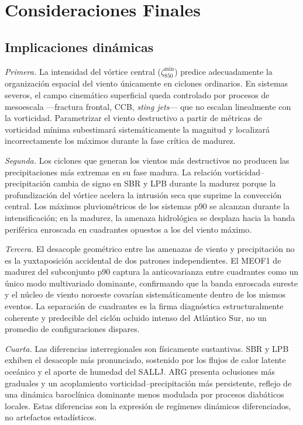 \chapter{Consideraciones Finales}\label{cap:Considerações}


\section{Implicaciones dinámicas}

\textit{Primera.} La intensidad del vórtice central ($\zeta_{850}^{\min}$) predice adecuadamente la organización espacial del viento únicamente en ciclones ordinarios. En sistemas severos, el campo cinemático superficial queda controlado por procesos de mesoescala ---fractura frontal, CCB, \textit{sting jets}--- que no escalan linealmente con la vorticidad. Parametrizar el viento destructivo a partir de métricas de vorticidad mínima subestimará sistemáticamente la magnitud y localizará incorrectamente los máximos durante la fase crítica de madurez.

\textit{Segunda.} Los ciclones que generan los vientos más destructivos no producen las precipitaciones más extremas en su fase madura. La relación vorticidad--precipitación cambia de signo en SBR y LPB durante la madurez porque la profundización del vórtice acelera la intrusión seca que suprime la convección central. Los máximos pluviométricos de los sistemas p90 se alcanzan durante la intensificación; en la madurez, la amenaza hidrológica se desplaza hacia la banda periférica enroscada en cuadrantes opuestos a los del viento máximo.

\textit{Tercera.} El desacople geométrico entre las amenazas de viento y precipitación no es la yuxtaposición accidental de dos patrones independientes. El MEOF1 de madurez del subconjunto p90 captura la anticovarianza entre cuadrantes como un único modo multivariado dominante, confirmando que la banda enroscada sureste y el núcleo de viento noroeste covarían sistemáticamente dentro de los mismos eventos. La separación de cuadrantes es la firma diagnóstica estructuralmente coherente y predecible del ciclón ocluido intenso del Atlántico Sur, no un promedio de configuraciones dispares.

\textit{Cuarta.} Las diferencias interregionales son físicamente sustantivas. SBR y LPB exhiben el desacople más pronunciado, sostenido por los flujos de calor latente oceánico y el aporte de humedad del SALLJ. ARG presenta oclusiones más graduales y un acoplamiento vorticidad--precipitación más persistente, reflejo de una dinámica baroclínica dominante menos modulada por procesos diabáticos locales. Estas diferencias son la expresión de regímenes dinámicos diferenciados, no artefactos estadísticos.

